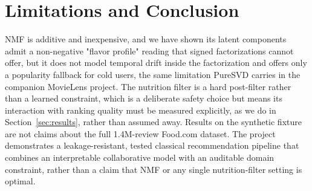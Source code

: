 \section{Limitations and Conclusion}
NMF is additive and inexpensive, and we have shown its latent components
admit a non-negative "flavor profile" reading that signed factorizations
cannot offer, but it does not model temporal drift inside the
factorization and offers only a popularity fallback for cold users, the
same limitation PureSVD carries in the companion MovieLens project. The
nutrition filter is a hard post-filter rather than a learned constraint,
which is a deliberate safety choice but means its interaction with ranking
quality must be measured explicitly, as we do in Section~\ref{sec:results},
rather than assumed away. Results on the synthetic fixture are not claims
about the full 1.4M-review Food.com dataset. The project demonstrates a
leakage-resistant, tested classical recommendation pipeline that combines
an interpretable collaborative model with an auditable domain constraint,
rather than a claim that NMF or any single nutrition-filter setting is
optimal.
